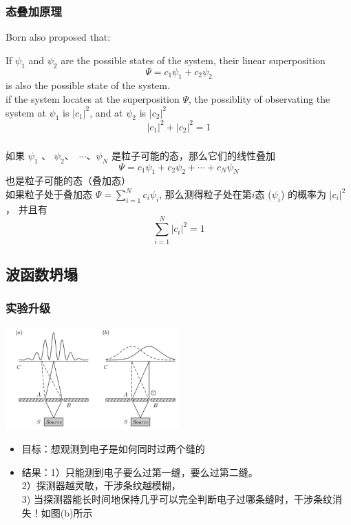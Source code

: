 \begin{frame}
    \frametitle{态叠加原理}
    Born also proposed that: \\
    \begin{tcolorbox4}
    If $\psi_1$ and $\psi_2$ are the possible states of the system,
    their linear superposition \[ \Psi=c_1 \psi_1+ c_2\psi_2 \]
    is also the possible state of the system.\\
    if the system locates at the superposition $\Psi$, the possiblity of observating the system at $\psi_1$ is $|c_1|^2$, and at $\psi_2$ is $|c_2|^2$ \\
    \[|c_1 |^2 + |c_2 |^2 =1\]
    \end{tcolorbox4}
\end{frame}

\begin{frame}
    \frametitle{}
    \begin{tcolorbox4}[态叠加原理中文表述]
    如果 $\psi_1$ 、 $\psi_2$、 $\cdots$、$\psi_N$ 是粒子可能的态，那么它们的线性叠加
        $$ \Psi=c_1 \psi_1+ c_2\psi_2+\cdots+c_N\psi_N $$
    也是粒子可能的态（叠加态）\\   
    如果粒子处于叠加态 $\Psi=\sum\limits_{i=1}^N c_i \psi_i$,  
    那么测得粒子处在第$i$态 ($\psi_i$) 的概率为 $|c_i |^2$， 
    并且有  $$\sum_{i=1}^{N} |c_i|^2 =1$$
    \end{tcolorbox4}
\end{frame}

\subsection{波函数坍塌}

\begin{frame}
    \frametitle{实验升级}
    \begin{center}
        \includegraphics[width=0.5\textwidth]{figs/sup-4.png} \\
    \end{center} 
    \begin{itemize}
        \item 目标：想观测到电子是如何同时过两个缝的
        \item 结果：1）只能测到电子要么过第一缝，要么过第二缝。\\
        2）探测器越灵敏，干涉条纹越模糊，\\
        3) 当探测器能长时间地保持几乎可以完全判断电子过哪条缝时，干涉条纹消失！如图(b)所示
    \end{itemize}
\end{frame}

